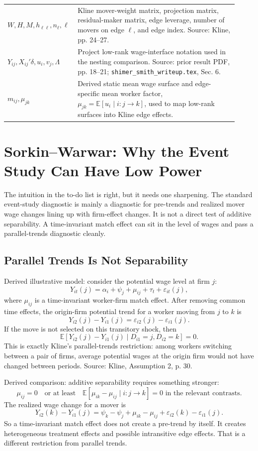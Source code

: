 \documentclass[11pt]{article}
\newcommand{\E}{\mathbb{E}}
\begin{document}
\begin{center}
\begin{tabular}{>{\raggedright\arraybackslash}p{0.24\linewidth}
                >{\raggedright\arraybackslash}p{0.68\linewidth}}
$W,H,M,h_{\ell\ell},n_\ell,\ell$ & Kline mover-weight matrix, projection matrix, residual-maker matrix, edge leverage, number of movers on edge $\ell$, and edge index. Source: Kline, pp. 24--27. \\
$Y_{ij},X_{ij}'\delta,u_i,v_j,\Lambda$ & Project low-rank wage-interface notation used in the nesting comparison. Source: prior result PDF, pp. 18--21; \texttt{shimer\_smith\_writeup.tex}, Sec. 6. \\
$m_{ij},\mu_{jk}$ & Derived static mean wage surface and edge-specific mean worker factor, $\mu_{jk}=\E[u_i\mid i:j\to k]$, used to map low-rank surfaces into Kline edge effects. \\
\bottomrule
\end{tabular}
\end{center}

\section{Sorkin--Warwar: Why the Event Study Can Have Low Power}

The intuition in the to-do list is right, but it needs one sharpening. The standard
event-study diagnostic is mainly a diagnostic for pre-trends and realized mover
wage changes lining up with firm-effect changes. It is not a direct test of additive
separability. A time-invariant match effect can sit in the level of wages and pass
a parallel-trends diagnostic cleanly.

\subsection{Parallel Trends Is Not Separability}

Derived illustrative model: consider the potential wage level at firm $j$:
\[
Y_{it}(j)=\alpha_i+\psi_j+\mu_{ij}+\tau_t+\varepsilon_{it}(j),
\]
where $\mu_{ij}$ is a time-invariant worker-firm match effect. After removing
common time effects, the origin-firm potential trend for a worker moving from
$j$ to $k$ is
\[
Y_{i2}(j)-Y_{i1}(j)
=
\varepsilon_{i2}(j)-\varepsilon_{i1}(j).
\]
If the move is not selected on this transitory shock, then
\[
\E[Y_{i2}(j)-Y_{i1}(j)\mid D_{i1}=j,D_{i2}=k]=0.
\]
This is exactly Kline's parallel-trends restriction: among workers switching
between a pair of firms, average potential wages at the origin firm would not
have changed between periods. Source: Kline, Assumption 2, p. 30.

Derived comparison: additive separability requires something stronger:
\[
\mu_{ij}=0
\quad\text{or at least}\quad
\E[\mu_{ik}-\mu_{ij}\mid i:j\to k]=0
\text{ in the relevant contrasts.}
\]
The realized wage change for a mover is
\[
Y_{i2}(k)-Y_{i1}(j)
=
\psi_k-\psi_j+\mu_{ik}-\mu_{ij}
+\varepsilon_{i2}(k)-\varepsilon_{i1}(j).
\]
So a time-invariant match effect does not create a pre-trend by itself. It creates
heterogeneous treatment effects and possible intransitive edge effects. That is a
different restriction from parallel trends.
\end{document}
